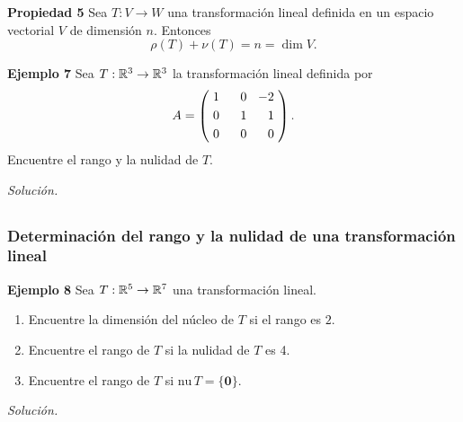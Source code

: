 \begin{frame}%

\begin{prop}{\textbf{Propiedad 5}}
	\justifying
	Sea $T:V\to W$ una transformación lineal definida en un espacio vectorial $V$ de dimensión $n$. Entonces
	\[
	\rho(T) + \nu(T) = n = \dim V.
	\]
\end{prop}	

\begin{ej}{\textbf{Ejemplo 7}}
	\justifying
	Sea $T:\mathbb{R}^3\to \mathbb{R}^3$ la transformación lineal definida por 
	\[
	A = 
	\left(
	\begin{array}{@{\hspace{0.5\tabcolsep}}r@{\hspace{1.5\tabcolsep}}r@{\hspace{1.5\tabcolsep}}r@{\hspace{0.5\tabcolsep}}}
	1 & \phantom{-}0 & -2 \\[1mm]
	0 & 1 &  1  \\[1mm]
	0 & 0 &  0 
	\end{array}
	\right).
	\]
	Encuentre el rango y la nulidad de $T$.
\end{ej}
\textit{Solución.}

\end{frame}


\subsection{}

\begin{frame}\frametitle{Determinación del rango y la nulidad de una transformación lineal}


\begin{ej}{\textbf{Ejemplo 8}}
	\justifying
	Sea $T:\mathbb{R}^5\to \mathbb{R}^7$ una transformación lineal.
	\begin{enumerate}
		\item[\labelname{$a$}] Encuentre la dimensión del núcleo de $T$ si el rango es $2$.
		\item[\labelname{$b$}] Encuentre el rango de $T$ si la nulidad de $T$ es 4.
		\item[\labelname{$c$}] Encuentre el rango de $T$ si $\text{nu}\,T=\{\mathbf{0}\}$.
	\end{enumerate}
\end{ej}
\textit{Solución.}

\end{frame}
